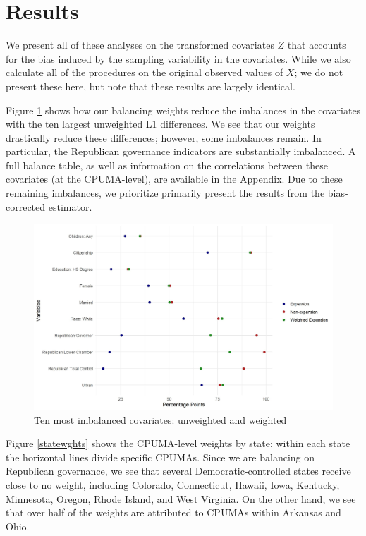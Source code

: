 \documentclass[12pt]{article}
\begin{document}
\section{Results}

We present all of these analyses on the transformed covariates $Z$ that accounts for the bias induced by the sampling variability in the covariates. While we also calculate all of the procedures on the original observed values of $X$; we do not present these here, but note that these results are largely identical. 

Figure \ref{loveplot} shows how our balancing weights reduce the imbalances in the covariates with the ten largest unweighted L1 differences. We see that our weights drastically reduce these differences; however, some imbalances remain. In particular, the Republican governance indicators are substantially imbalanced. A full balance table, as well as information on the correlations between these covariates (at the CPUMA-level), are available in the Appendix. Due to these remaining imbalances, we prioritize primarily present the results from the bias-corrected estimator.

\begin{figure}[B]
\begin{center}
    \includegraphics[scale=0.6]{images/balance-plot-largest10-unweighted.jpeg}
    \caption{Ten most imbalanced covariates: unweighted and weighted}
    \label{loveplot}
\end{center}
\end{figure}

Figure \ref{statewghts} shows the CPUMA-level weights by state; within each state the horizontal lines divide specific CPUMAs. Since we are balancing on Republican governance, we see that several Democratic-controlled states receive close to no weight, including Colorado, Connecticut, Hawaii, Iowa, Kentucky, Minnesota, Oregon, Rhode Island, and West Virginia. On the other hand, we see that over half of the weights are attributed to CPUMAs within Arkansas and Ohio.
\end{document}
